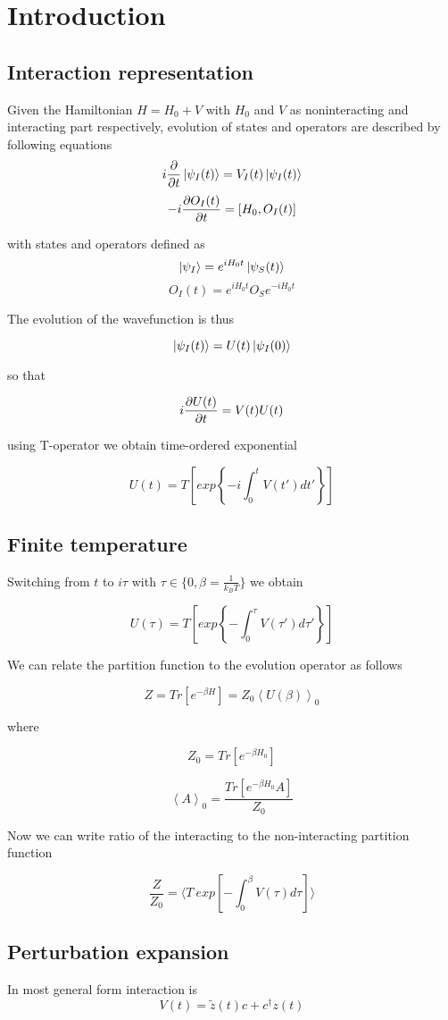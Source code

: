 \section{Introduction}
\subsection{Interaction representation}

Given the Hamiltonian $H=H_0+V$ with $H_0$ and $V$ as noninteracting and interacting part respectively,
evolution of states and operators are described by following equations
\[ i\frac{\partial }{\partial t}\ket{\psi_I(t)}=V_I(t)\ket{\psi_I(t)} \]
\[ -i\frac{\partial O_I(t)}{\partial t}=\left[H_0,O_I(t)\right] \]

with states and operators defined as
\[ \ket{\psi_I} = e^{i H_0 t}\ket{\psi_S(t)} \]
\[ O_I(t) = e^{i H_0 t} O_S e^{-i H_0 t} \] 

The evolution of the wavefunction is thus

\[ \ket{\psi_I(t)} = U(t) \ket{\psi_I(0)} \]

so that

\[ i\frac{\partial U(t)}{\partial t} = V(t) U(t) \]

using T-operator we obtain time-ordered exponential

\[ U(t) = T\left[exp\left\{-i\int_{0}^{t}V(t')dt'\right\}\right] \]

\subsection{Finite temperature}
Switching from $t$ to $i\tau$ with $\tau\in\{0,\beta=\frac{1}{k_B T}\}$ we obtain

\[ U(\tau) = T\left[exp\left\{-\int_{0}^{\tau}V(\tau')d\tau'\right\}\right] \]

We can relate the partition function to the evolution operator as follows

\[ Z = Tr\left[e^{-\beta H}\right] = Z_0\left<U(\beta)\right>_0 \]

where 

\[ Z_0 = Tr\left[e^{-\beta H_0}\right] \]

\[ \left<A\right>_0 = \frac{Tr\left[e^{-\beta H_0}A\right]}{Z_0} \]

Now we can write ratio of the interacting to the non-interacting partition function

\[ \frac{Z}{Z_0} = \langle T\ exp\left[-\int_{0}^{\beta}V(\tau)d\tau\right]\rangle \]

\subsection{Perturbation expansion}
In most general form interaction is
\[ V(t) = \tilde{z}(t)c+c^\dagger z(t) \] 

